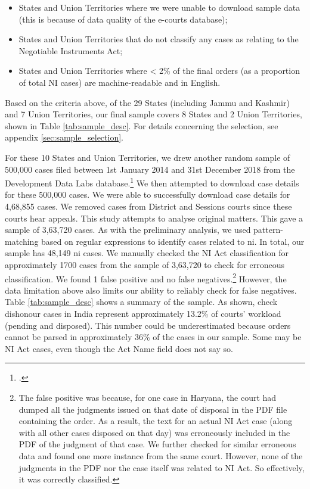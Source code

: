 \documentclass[12pt,a4paper]{article}
\begin{document}
\begin{itemize}
\item States and Union Territories where we were unable to download sample data (this is because of data quality of the e-courts database);
\item States and Union Territories that do not classify any cases as relating to the Negotiable Instruments Act;
\item States and Union Territories where < 2\% of the final orders (as a proportion of total NI cases) are machine-readable and in English.
\end{itemize}

Based on the criteria above, of the 29 States (including Jammu and Kashmir) and 7 Union Territories, our final sample covers 8 States and 2 Union Territories, shown in Table \ref{tab:sample_desc}. For details concerning the selection, see appendix \ref{sec:sample_selection}.

For these 10 States and Union Territories, we drew another random sample of 500,000 cases filed between 1st January 2014 and 31st December 2018 from the Development Data Labs database.\footcite{devdatalabs2021_eCourtsData} We then attempted to download case details for these 500,000 cases. We were able to successfully download case details for 4,68,855 cases. We removed cases from District and Sessions courts since these courts hear appeals. This study attempts to analyse original matters. This gave a sample of 3,63,720 cases. As with the preliminary analysis, we used pattern-matching based on regular expressions to identify cases related to \gls{ni}. In total, our sample has 48,149 \gls{ni} cases. We manually checked the NI Act classification for approximately 1700 cases from the sample of 3,63,720 to check for erroneous classification. We found 1 false positive and no false negatives.\footnote{The false positive was because, for one case in Haryana, the court had dumped all the judgments issued on that date of disposal in the PDF file containing the order. As a result, the text for an actual NI Act case (along with all other cases disposed on that day) was erroneously included in the PDF of the judgment of that case. We further checked for similar erroneous data and found one more instance from the same court. However, none of the judgments in the PDF nor the case itself was related to NI Act. So effectively, it was correctly classified.} However, the data limitation above also limits our ability to reliably check for false negatives. Table \ref{tab:sample_desc} shows a summary of the sample. As shown, check dishonour cases in India represent approximately 13.2\% of courts' workload (pending and disposed). This number could be underestimated because orders cannot be parsed in approximately 36\% of the cases in our sample. Some may be NI Act cases, even though the Act Name field does not say so.
\end{document}
